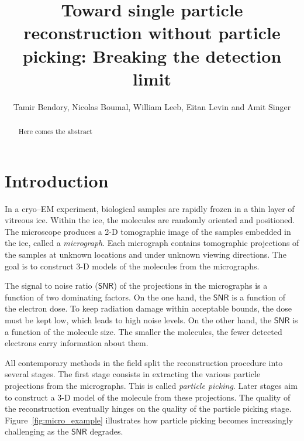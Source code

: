 \documentclass[english,11pt]{article}
\newcommand{\1}{\mathbf{1}}
\newcommand{\TODO}[1]{{\color{red}{[#1]}}}
\numberwithin{equation}{section}
\theoremstyle{plain}
\theoremstyle{definition}
\theoremstyle{remark}
\theoremstyle{plain}
\theoremstyle{remark}
\theoremstyle{plain}
\theoremstyle{plain}
\newcommand{\SNR}{\ensuremath{\textsf{SNR}}}
\begin{document}
\title{Toward single particle reconstruction without particle picking: Breaking the detection limit}


\author{Tamir Bendory, Nicolas Boumal, William Leeb, Eitan Levin and Amit Singer}
\maketitle

\begin{abstract}
	Here comes the abstract
\end{abstract}

\section{Introduction}

\TODO{Revise--Cryo--electron microscopy (cryo--EM) is an innovative technology for single particle reconstruction (SPR) of macromolecules.} 
% 
In a cryo--EM experiment, biological samples are rapidly frozen in a thin layer of vitreous ice. Within the ice, the molecules are randomly oriented and positioned. The microscope produces a 2-D tomographic image of the samples embedded in the ice, called a \emph{micrograph}. Each micrograph contains tomographic projections of the samples at unknown locations and under unknown viewing directions. The goal is to construct 3-D models of the molecules from the micrographs.

The signal to noise ratio ($\SNR$) of the projections in the micrographs is a function of two dominating factors. On the one hand, the $\SNR$ is a function of the electron dose. To keep radiation damage within acceptable bounds, the dose must be kept low, which leads to high noise levels. On the other hand, the $\SNR$ is a function of the molecule size. The smaller the molecules, the fewer detected electrons carry information about them.

All contemporary methods in the field split the reconstruction procedure into several stages.
The first stage consists in extracting the various particle projections from the micrographs. This is called \emph{particle picking}. Later stages aim to construct a 3-D model of the molecule from these projections. The quality of the reconstruction eventually hinges on the quality of the particle picking stage. Figure~\ref{fig:micro_example} illustrates how particle picking becomes increasingly challenging as the $\SNR$ degrades.
\end{document}
